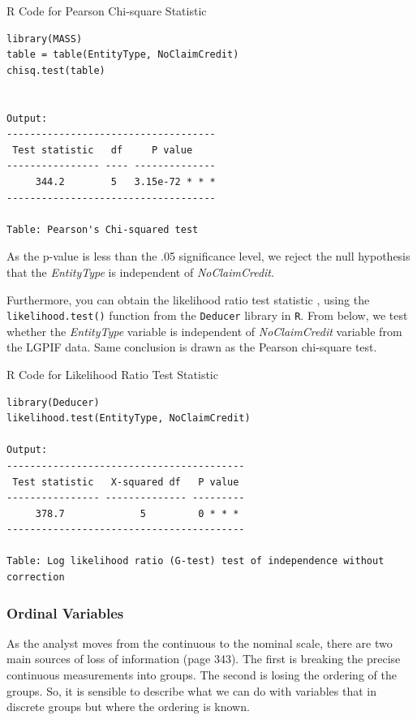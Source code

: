 \documentclass[]{book}
\theoremstyle{definition}
\theoremstyle{definition}
\theoremstyle{definition}
\theoremstyle{remark}
\begin{document}
R Code for Pearson Chi-square Statistic

\hypertarget{display.chi.2}{}
\begin{verbatim}
library(MASS)
table = table(EntityType, NoClaimCredit)
chisq.test(table)


Output:
------------------------------------
 Test statistic   df     P value    
---------------- ---- --------------
     344.2        5   3.15e-72 * * *
------------------------------------

Table: Pearson's Chi-squared test
\end{verbatim}

As the p-value is less than the .05 significance level, we reject the
null hypothesis that the \emph{EntityType} is independent of
\emph{NoClaimCredit}.

Furthermore, you can obtain the likelihood ratio test statistic , using
the \texttt{likelihood.test()} function from the \texttt{Deducer}
library in \texttt{R}. From below, we test whether the \emph{EntityType}
variable is independent of \emph{NoClaimCredit} variable from the LGPIF
data. Same conclusion is drawn as the Pearson chi-square test.

R Code for Likelihood Ratio Test Statistic

\hypertarget{display.lik.2}{}
\begin{verbatim}
library(Deducer)
likelihood.test(EntityType, NoClaimCredit)

Output:
-----------------------------------------
 Test statistic   X-squared df   P value 
---------------- -------------- ---------
     378.7             5         0 * * * 
-----------------------------------------

Table: Log likelihood ratio (G-test) test of independence without correction
\end{verbatim}

\subsubsection{Ordinal Variables}\label{ordinal-variables}

As the analyst moves from the continuous to the nominal scale, there are
two main sources of loss of information \citep{bishop1975discrete} (page
343). The first is breaking the precise continuous measurements into
groups. The second is losing the ordering of the groups. So, it is
sensible to describe what we can do with variables that in discrete
groups but where the ordering is known.
\end{document}
